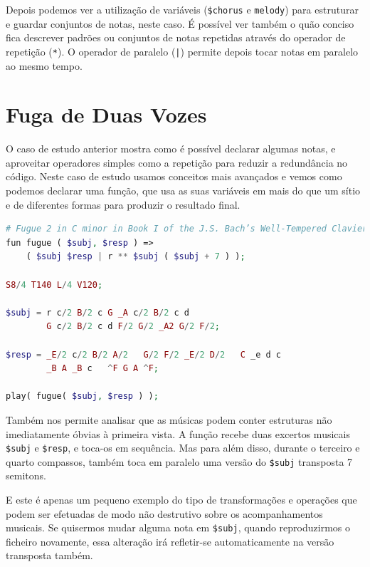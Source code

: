 Depois podemos ver a utilização de variáveis (\texttt{\$chorus} e \texttt{melody}) para estruturar e guardar conjuntos de notas, neste caso.
É possível ver também o quão conciso fica descrever padrões ou conjuntos de notas repetidas através do operador de repetição (\texttt{*}). O operador de paralelo (\texttt{|}) permite depois tocar notas em paralelo ao mesmo tempo.

\section{Fuga de Duas Vozes}
\label{casestudies:fugue}
O caso de estudo anterior mostra como é possível declarar algumas notas, e aproveitar operadores simples como a repetição para reduzir a redundância no código. Neste caso de estudo usamos conceitos mais avançados e vemos como podemos declarar uma função, que usa as suas variáveis em mais do que um sítio e de diferentes formas para produzir o resultado final.
\begin{lstlisting}[caption=Exemplo da declaração da estrutura e conteúdo de uma simples fuga de duas vozes,language=PHP]
# Fugue 2 in C minor in Book I of the J.S. Bach’s Well-Tempered Clavier
fun fugue ( $subj, $resp ) => 
    ( $subj $resp | r ** $subj ( $subj + 7 ) );

S8/4 T140 L/4 V120;

$subj = r c/2 B/2 c G _A c/2 B/2 c d
        G c/2 B/2 c d F/2 G/2 _A2 G/2 F/2;

$resp = _E/2 c/2 B/2 A/2   G/2 F/2 _E/2 D/2   C _e d c
        _B A _B c   ^F G A ^F;

play( fugue( $subj, $resp ) );
\end{lstlisting}

Também nos permite analisar que as músicas podem conter estruturas não imediatamente óbvias à primeira vista. A função recebe duas excertos musicais \texttt{\$subj} e \texttt{\$resp}, e toca-os em sequência. Mas para além disso, durante o terceiro e quarto compassos, também toca em paralelo uma versão do \texttt{\$subj} transposta 7 semitons. 

E este é apenas um pequeno exemplo do tipo de transformações e operações que podem ser efetuadas de modo não destrutivo sobre os acompanhamentos musicais. Se quisermos mudar alguma nota em \texttt{\$subj}, quando reproduzirmos o ficheiro novamente, essa alteração irá refletir-se automaticamente na versão transposta também.

